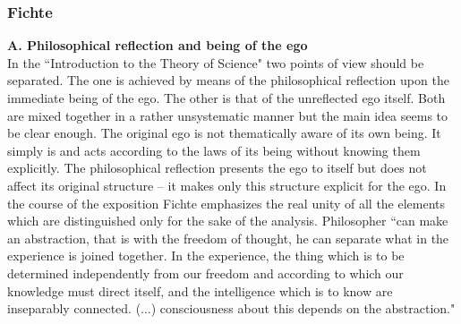 \subsubsection{ Fichte}\label{empFichte}
{\bf A. Philosophical reflection and being of the ego}\\
 In the ``Introduction to the Theory of Science" two points of view should be separated. The one is achieved by 
means of the philosophical reflection upon the immediate being of the ego. The other is that of the unreflected ego 
itself. Both are mixed together in a rather unsystematic manner but the main idea seems to be clear enough. The 
original ego is not thematically aware of its own being. It simply is and acts according to the laws of its being 
without knowing them explicitly. The philosophical reflection presents the ego to itself but does not affect its 
original structure -- it makes only this structure explicit for the ego. In the course of the exposition Fichte 
emphasizes the real unity of all the elements which are distinguished only for the sake of the analysis. Philosopher 
``can make an abstraction, that is with the freedom of thought, he can separate what in the experience is joined 
together. In the experience, the thing which is to be determined independently from our freedom and according to 
which our knowledge must direct itself, and the intelligence which is to know are inseparably connected. (...) 
consciousness about this depends on the abstraction." \cite{ITS} 

